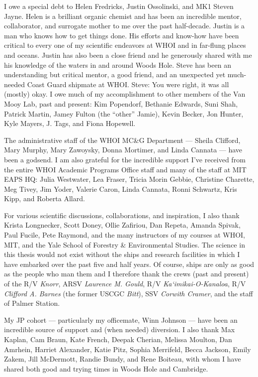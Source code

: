 \begin{singlespace}
I owe a special debt to Helen Fredricks, Justin Ossolinski, and MK1 Steven Jayne. Helen is a brilliant organic chemist and has been an incredible mentor, collaborator, and surrogate mother to me over the past half-decade. Justin is a man who knows how to get things done. His efforts and know-how have been critical to every one of my scientific endeavors at WHOI and in far-flung places and oceans. Justin has also been a close friend and he generously shared with me his knowledge of the waters in and around Woods Hole. Steve has been an understanding but critical mentor, a good friend, and an unexpected yet much-needed Coast Guard shipmate at WHOI. Steve: You were right, it was all (mostly) okay. I owe much of my accomplishment to other members of the Van Mooy Lab, past and present: Kim Popendorf, Bethanie Edwards, Suni Shah, Patrick Martin, Jamey Fulton (the ``other'' Jamie), Kevin Becker, Jon Hunter, Kyle Mayers, J. Tags, and Fiona Hopewell.

The administrative staff of the WHOI MC\&G Department --- Sheila Clifford, Mary Murphy, Mary Zawoysky, Donna Mortimer, and Linda Cannata --- have been a godsend. I am also grateful for the incredible support I've received from the entire WHOI Academic Programs Office staff and many of the staff at MIT EAPS HQ: Julia Westwater, Lea Fraser, Tricia Morin Gebbie, Christine Charette, Meg Tivey, Jim Yoder, Valerie Caron, Linda Cannata, Ronni Schwartz, Kris Kipp, and Roberta Allard.

For various scientific discussions, collaborations, and inspiration, I also thank Krista Longnecker, Scott Doney, Ollie Zafiriou, Dan Repeta, Amanda Spivak, Paul Fucile, Pete Raymond, and the many instructors of my courses at WHOI, MIT, and the Yale School of Forestry \& Environmental Studies. The science in this thesis would not exist without the ships and research facilities in which I have embarked over the past five and half years. Of course, ships are only as good as the people who man them and I therefore thank the crews (past and present) of the R/V \emph{Knorr}, ARSV \emph{Laurence M. Gould}, R/V \emph{Ka`imikai-O-Kanaloa}, R/V \emph{Clifford A. Barnes} (the former USCGC \emph{Bitt}), SSV \emph{Corwith Cramer}, and the staff of Palmer Station.

My JP cohort --- particularly my officemate, Winn Johnson --- have been an incredible source of support and (when needed) diversion. I also thank Max Kaplan, Cam Braun, Kate French, Deepak Cherian, Melissa Moulton, Dan Amrhein, Harriet Alexander, Katie Pitz, Sophia Merrifeld, Becca Jackson, Emily Zakem, Jill McDermott, Randie Bundy, and Rene Boiteau, with whom I have shared both good and trying times in Woods Hole and Cambridge.


\end{singlespace}
